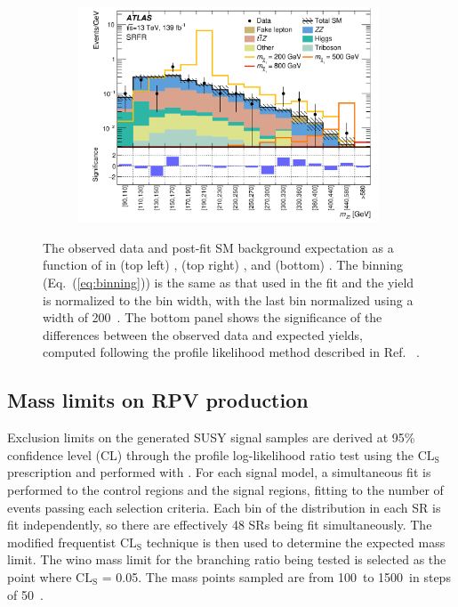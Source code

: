 \begin{figure}[ht]
\begin{subfigure}[b]{0.49\textwidth}
      \caption{}
      \label{fig:mZl_SR4l}
    \end{subfigure}
    \hfill
    \begin{subfigure}[b]{0.49\textwidth}
      \centering
      \includegraphics[width=0.98\textwidth]{figs/rpvthreel/histpull_all_doSRsInBkg_SRTL.png}
      \caption{}
      \label{fig:mZl_SRFR}
    \end{subfigure}
    \caption[The observed data and post-fit SM background expectation as a function of \mZl in \SRTL, \SRFour, and \SRThree]{The observed data and post-fit SM background expectation as a function of \mZl in (top left) \SRTL, (top right) \SRFour, and (bottom) \SRThree.
    The \mZl binning (Eq.~(\ref{eq:binning})) is the same as that used in the fit and the yield is normalized to the bin width, with the last bin normalized using a width of 200~\GeV. 
    \captionlegend
    \captionsysband
    The bottom panel shows the significance of the differences between the observed data and expected yields,
    computed following the profile likelihood method described in Ref.~\cite{Cousins:2007bmb}
    \cite{ATLAS:2020uer}.}
    \label{fig:mZl}
\end{figure}

\subsection{Mass limits on \BL RPV production}
Exclusion limits on the generated SUSY \chono signal samples are derived at 95\% confidence level (CL) through the profile log-likelihood ratio test using the \(\mathrm{CL_S}\) prescription and performed with \Histfitter.
For each signal model, a simultaneous fit is performed to the control regions and the signal regions, fitting to the number of events passing each selection criteria. 
Each bin of the \mZl distribution in each SR is fit independently, so there are effectively 48 SRs being fit simultaneously.
The modified frequentist \(\mathrm{CL_S}\) technique is then used to determine the expected mass limit. 
The wino mass limit for the branching ratio being tested is selected as the point where \(\mathrm{CL_S}\) = 0.05.
The mass points sampled are from 100~\GeV to 1500~\GeV in steps of 50~\GeV.

